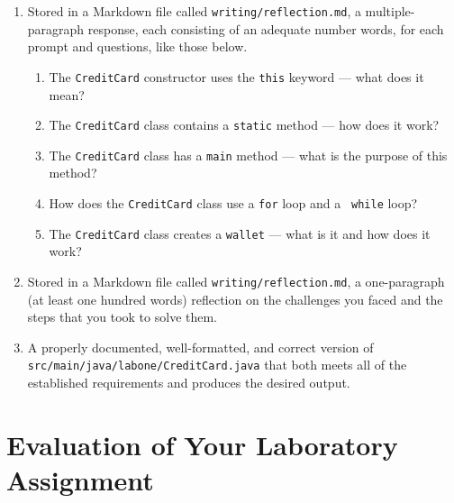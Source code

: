 \documentclass[11pt]{article}
\newcommand{\mainprogramsource}{\lstinline{src/main/java/labone/CreditCard.java}}
\newcommand{\reflection}{\lstinline{writing/reflection.md}}
\begin{document}
\begin{enumerate}

  \setlength{\itemsep}{0in}

\item Stored in a Markdown file called \reflection{}, a multiple-paragraph
  response, each consisting of an adequate number words, for each prompt and
  questions, like those below.

  \vspace*{-.1in}

  \begin{enumerate}
    \itemsep 0em

    \item The {\tt CreditCard} constructor uses the {\tt this} keyword --- what
      does it mean?

    \item The {\tt CreditCard} class contains a {\tt static} method --- how does
      it work?

    \item The {\tt CreditCard} class has a {\tt main} method --- what is the
      purpose of this method?

    \item How does the {\tt CreditCard} class use a {\tt for} loop and a {\tt
      while} loop?

    \item The {\tt CreditCard} class creates a {\tt wallet} --- what is it and
      how does it work?

  \end{enumerate}

\vspace*{-.1in}

\item Stored in a Markdown file called \reflection{}, a one-paragraph (at least
  one hundred words) reflection on the challenges you faced and the steps that
  you took to solve them.

\item A properly documented, well-formatted, and correct version of
  \mainprogramsource{} that both meets all of the established requirements and
  produces the desired output.

\end{enumerate}

\section*{Evaluation of Your Laboratory Assignment}
\end{document}
